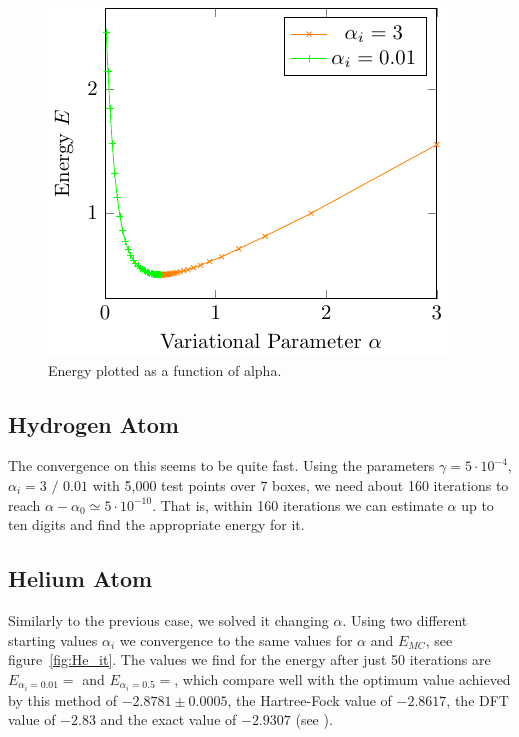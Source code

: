 \begin{figure}
	\begin{center}
		\includegraphics[scale=0.9]{graphs/ho-e-alpha.pdf}
		\caption{
			Energy plotted as a function of alpha. %
		}
		\label{fig:Ho_rel}
	\end{center}
\end{figure}


\subsection{Hydrogen Atom}
 The convergence on this seems to be quite fast. Using the parameters $\gamma = 5\cdot 10^{-4}$, $\alpha_i = 3 \text{~/~}0.01$ with 5,000 test points over $7$ boxes, we need about 160 iterations to reach $\alpha-\alpha_0 \simeq 5 \cdot 10^{-10}$. That is, within 160 iterations we can estimate $\alpha$ up to ten digits and find the appropriate energy for it.


\subsection{Helium Atom}

Similarly to the previous case, we solved it changing $\alpha$. Using two different starting values $\alpha_i$ we convergence to the same values for $\alpha$ and $E_{MC}$, see figure~\ref{fig:He_it}. The values we find for the energy after just 50 iterations are $E_{\alpha_i = 0.01} =  $ and $E_{\alpha_i = 0.5} =  $, which compare well with the optimum value achieved by this method of $-2.8781 \pm 0.0005$, the Hartree-Fock value of $-2.8617$, the DFT value of $-2.83$ and the exact value of $-2.9307$ (see \cite{JosBook}). %

